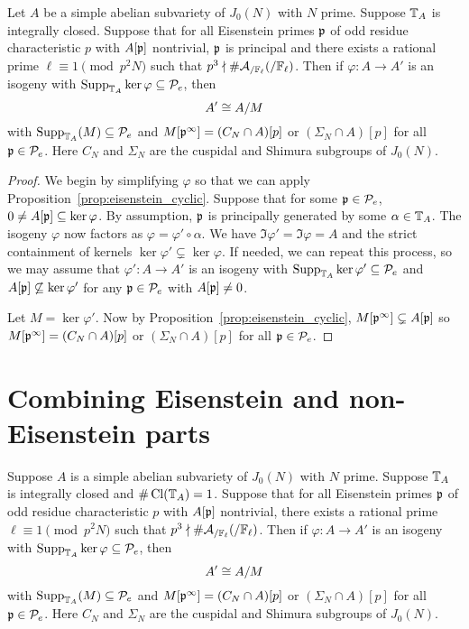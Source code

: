 \documentclass[thesis.tex]{subfiles}
\begin{document}
\begin{corollary}
    \label{cor:eisenstein}
    Let $A$ be a simple abelian subvariety of $J_0(N)$ with $N$ prime. Suppose
    $\mathbb{T}_A$ is integrally closed. Suppose that for all Eisenstein primes $\mathfrak{p}$
    of odd residue characteristic $p$ with $A[\mathfrak{p}]$ nontrivial, $\mathfrak{p}$ is
    principal and there exists a rational prime $\ell\equiv 1\pmod{p^2N}$ such
    that $p^3\nmid \#\mathcal{A}_{/\mathbb{F}_\ell}(/\mathbb{F}_\ell)$. Then if $\varphi:A\to
    A'$ is an isogeny with $\operatorname{Supp}_{\mathbb{T}_A} \ker\varphi\subseteq \mathcal{P}_e$, then
    \[
        A'\cong A/M
    \]
    with $\operatorname{Supp}_{\mathbb{T}_A}(M)\subseteq \mathcal{P}_e$ and $M[\mathfrak{p}^\infty]=(C_N\cap A)[p]$ or
    $(\Sigma_N\cap A)[p]$ for all $\mathfrak{p}\in \mathcal{P}_e$. Here $C_N$ and $\Sigma_N$ are
    the cuspidal and Shimura subgroups of $J_0(N)$.
\end{corollary}
\begin{proof}
    We begin by simplifying $\varphi$ so that we can apply
    Proposition~\ref{prop:eisenstein_cyclic}. Suppose that for some $\mathfrak{p}\in
    \mathcal{P}_e$, $0\neq A[\mathfrak{p}]\subseteq \ker\varphi$. By assumption, $\mathfrak{p}$ is
    principally generated by some $\alpha\in \mathbb{T}_A$. The isogeny $\varphi$ now
    factors as $\varphi=\varphi'\circ \alpha$. We have
    $\Im\varphi'=\Im\varphi=A$ and the strict containment of kernels
    $\ker\varphi'\subsetneq \ker\varphi$. If needed, we can repeat this
    process, so we may assume that $\varphi':A\to A'$ is an isogeny with
    $\operatorname{Supp}_{\mathbb{T}_A}\ker\varphi'\subseteq \mathcal{P}_e$ and $A[\mathfrak{p}]\not\subseteq
    \ker\varphi'$ for any $\mathfrak{p}\in \mathcal{P}_e$ with $A[\mathfrak{p}]\neq 0$.

    Let $M=\ker\varphi'$. Now by Proposition~\ref{prop:eisenstein_cyclic},
    $M[\mathfrak{p}^\infty]\subsetneq A[\mathfrak{p}]$ so $M[\mathfrak{p}^\infty]=(C_N\cap A)[p]$ or
    $(\Sigma_N\cap A)[p]$ for all $\mathfrak{p}\in \mathcal{P}_e$.
\end{proof}


\section{Combining Eisenstein and non-Eisenstein parts}%
\label{sec:combining_eisenstein_and_non_eisenstein_parts}

\begin{theorem}%
    \label{thm:combine}
    Suppose $A$ is a simple abelian subvariety of $J_0(N)$ with $N$ prime.
    Suppose $\mathbb{T}_A$ is integrally closed and $\#\operatorname{Cl}(\mathbb{T}_A)=1$. Suppose that for
    all Eisenstein primes $\mathfrak{p}$ of odd residue characteristic $p$ with $A[\mathfrak{p}]$
    nontrivial, there exists a rational prime $\ell\equiv 1\pmod{p^2N}$ such
    that $p^3\nmid \#\mathcal{A}_{/\mathbb{F}_\ell}(/\mathbb{F}_\ell)$. Then if $\varphi:A\to
    A'$ is an isogeny with $\operatorname{Supp}_{\mathbb{T}_A} \ker\varphi\subseteq \mathcal{P}_e$, then
    \[
        A'\cong A/M
    \]
    with $\operatorname{Supp}_{\mathbb{T}_A}(M)\subseteq \mathcal{P}_e$ and $M[\mathfrak{p}^\infty]=(C_N\cap A)[p]$ or
    $(\Sigma_N\cap A)[p]$ for all $\mathfrak{p}\in \mathcal{P}_e$. Here $C_N$ and $\Sigma_N$ are
    the cuspidal and Shimura subgroups of $J_0(N)$.
\end{theorem}
\end{document}

